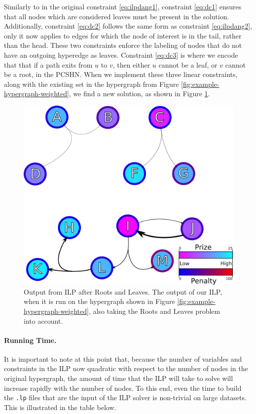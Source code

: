 \documentclass[12pt,twoside]{reedthesis}
\theoremstyle{definition}
\begin{document}
Similarly to in the original constraint \eqref{eq:ilpdang1}, constraint \eqref{eq:dc1} ensures that all nodes which are considered leaves must be present in the solution. Additionally, constraint \eqref{eq:dc2} follows the same form as constraint \eqref{eq:ilpdang2}, only it now applies to edges for which the node of interest is in the tail, rather than the head. These two constraints enforce the labeling of nodes that do not have an outgoing hyperedge as leaves. Constraint \eqref{eq:dc3} is where we encode that that if a path exits from $u$ to $v$, then either $u$ cannot be a leaf, or $v$ cannot be a root, in the PCSHN. When we implement these three linear constraints, along with the existing set in the hypergraph from Figure \ref{fig:example-hypergraph-weighted}, we find a new solution, as shown in Figure \ref{fig:example-hypergraph-weighted_DC}.

\begin{figure}[hp]
  \begin{center}
    \includegraphics[width=\textwidth]{example-hypergraph-weighted_DC}
  \caption[Output from ILP after Roots and Leaves.]{Output from ILP after Roots and Leaves. The output of our ILP, when it is run on the hypergraph shown in Figure \ref{fig:example-hypergraph-weighted}, also taking the Roots and Leaves problem into account.}
  \label{fig:example-hypergraph-weighted_DC}
  \end{center}
\end{figure}

\paragraph{Running Time.}It is important to note at this point that, because the number of variables and constraints in the ILP now quadratic with respect to the number of nodes in the original hypergraph, the amount of time that the ILP will take to solve will increase rapidly with the number of nodes. To this end, even the time to build the \texttt{.lp} files that are the input of the ILP solver is non-trivial on large datasets. This is illustrated in the table below.
\end{document}
